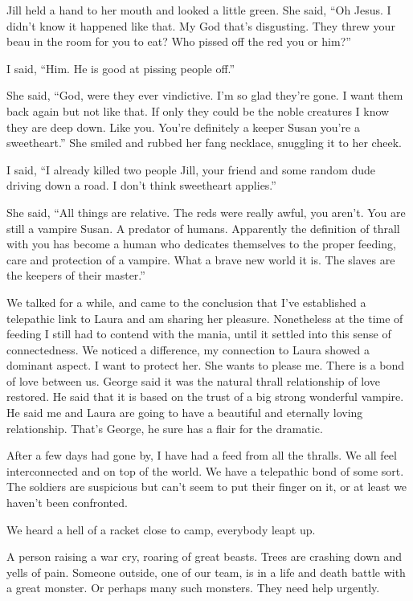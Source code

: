Jill held a hand to her mouth and looked a little green. She said, ``Oh Jesus. I didn't know it happened like that. My God that's disgusting. They threw your beau in the room for you to eat? Who pissed off the red you or him?''

I said, ``Him. He is good at pissing people off.''

She said, ``God, were they ever vindictive. I'm so glad they're gone. I want them back again but not like that. If only they could be the noble creatures I know they are deep down. Like you. You're definitely a keeper Susan you're a sweetheart.'' She smiled and rubbed her fang necklace, snuggling it to her cheek.

I said, ``I already killed two people Jill, your friend and some random dude driving down a road. I don't think sweetheart applies.''

She said, ``All things are relative. The reds were really awful, you aren't. You are still a vampire Susan. A predator of humans. Apparently the definition of thrall with you has become a human who dedicates themselves to the proper feeding, care and protection of a vampire. What a brave new world it is. The slaves are the keepers of their master.''

We talked for a while, and came to the conclusion that I've established a telepathic link to Laura and am sharing her pleasure. Nonetheless at the time of feeding I still had to contend with the mania, until it settled into this sense of connectedness. We noticed a difference, my connection to Laura showed a dominant aspect. I want to protect her. She wants to please me. There is a bond of love between us. George said it was the natural thrall relationship of love restored. He said that it is based on the trust of a big strong wonderful vampire. He said me and Laura are going to have a beautiful and eternally loving relationship. That's George, he sure has a flair for the dramatic.

\parasep

After a few days had gone by, I have had a feed from all the thralls. We all feel interconnected and on top of the world. We have a telepathic bond of some sort. The soldiers are suspicious but can't seem to put their finger on it, or at least we haven't been confronted. 

We heard a hell of a racket close to camp, everybody leapt up.

A person raising a war cry, roaring of great beasts. Trees are crashing down and yells of pain. Someone outside, one of our team, is in a life and death battle with a great monster. Or perhaps many such monsters. They need help urgently.

